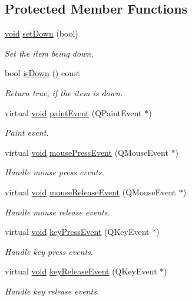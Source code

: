 \subsection*{Protected Member Functions}
\begin{DoxyCompactItemize}
\item 
\hyperlink{group___u_a_v_objects_plugin_ga444cf2ff3f0ecbe028adce838d373f5c}{void} \hyperlink{class_qwt_legend_item_a1c871e735a96cc86f95b4dffe2339f85}{set\-Down} (bool)
\begin{DoxyCompactList}\small\item\em Set the item being down. \end{DoxyCompactList}\item 
bool \hyperlink{class_qwt_legend_item_ad88e70289e552d67f881d0435fae1098}{is\-Down} () const 
\begin{DoxyCompactList}\small\item\em Return true, if the item is down. \end{DoxyCompactList}\item 
virtual \hyperlink{group___u_a_v_objects_plugin_ga444cf2ff3f0ecbe028adce838d373f5c}{void} \hyperlink{class_qwt_legend_item_ac154aa6b045d78f8134bbfab19a9729b}{paint\-Event} (Q\-Paint\-Event $\ast$)
\begin{DoxyCompactList}\small\item\em Paint event. \end{DoxyCompactList}\item 
virtual \hyperlink{group___u_a_v_objects_plugin_ga444cf2ff3f0ecbe028adce838d373f5c}{void} \hyperlink{class_qwt_legend_item_aaf54f5473fc174aac5cb5cdcfdcc7292}{mouse\-Press\-Event} (Q\-Mouse\-Event $\ast$)
\begin{DoxyCompactList}\small\item\em Handle mouse press events. \end{DoxyCompactList}\item 
virtual \hyperlink{group___u_a_v_objects_plugin_ga444cf2ff3f0ecbe028adce838d373f5c}{void} \hyperlink{class_qwt_legend_item_a37950b4dd9de4dfe74c05eee572c16a2}{mouse\-Release\-Event} (Q\-Mouse\-Event $\ast$)
\begin{DoxyCompactList}\small\item\em Handle mouse release events. \end{DoxyCompactList}\item 
virtual \hyperlink{group___u_a_v_objects_plugin_ga444cf2ff3f0ecbe028adce838d373f5c}{void} \hyperlink{class_qwt_legend_item_a9b6a6527d2b867a912a21ef3358eb63f}{key\-Press\-Event} (Q\-Key\-Event $\ast$)
\begin{DoxyCompactList}\small\item\em Handle key press events. \end{DoxyCompactList}\item 
virtual \hyperlink{group___u_a_v_objects_plugin_ga444cf2ff3f0ecbe028adce838d373f5c}{void} \hyperlink{class_qwt_legend_item_a0b31f4435914a8cd0491ea8aab45041f}{key\-Release\-Event} (Q\-Key\-Event $\ast$)
\begin{DoxyCompactList}\small\item\em Handle key release events. \end{DoxyCompactList}\end{DoxyCompactItemize}
